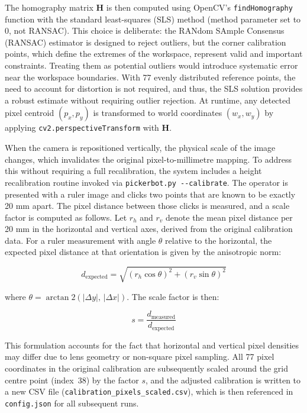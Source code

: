 \documentclass[conference]{IEEEtran}
\begin{document}
The homography matrix $\mathbf{H}$ is then computed using OpenCV's \texttt{findHomography} function with the standard least-squares (SLS) method (method parameter set to 0, not RANSAC). This choice is deliberate: the RANdom SAmple Consensus (RANSAC) estimator is designed to reject outliers, but the corner calibration points, which define the extremes of the workspace, represent valid and important constraints. Treating them as potential outliers would introduce systematic error near the workspace boundaries. With 77 evenly distributed reference points, the need to account for distortion is not required, and thus, the SLS solution provides a robust estimate without requiring outlier rejection. At runtime, any detected pixel centroid $(p_x, p_y)$ is transformed to world coordinates $(w_x, w_y)$ by applying \texttt{cv2.perspectiveTransform} with $\mathbf{H}$.

When the camera is repositioned vertically, the physical scale of the image changes, which invalidates the original pixel-to-millimetre mapping. To address this without requiring a full recalibration, the system includes a height recalibration routine invoked via \texttt{pickerbot.py {-}{-}calibrate}. The operator is presented with a ruler image and clicks two points that are known to be exactly 20 mm apart. The pixel distance between those clicks is measured, and a scale factor is computed as follows. Let $r_h$ and $r_v$ denote the mean pixel distance per 20 mm in the horizontal and vertical axes, derived from the original calibration data. For a ruler measurement with angle $\theta$ relative to the horizontal, the expected pixel distance at that orientation is given by the anisotropic norm:

\begin{equation}
  d_{\mathrm{expected}} = \sqrt{\left(r_h \cos\theta\right)^2 + \left(r_v \sin\theta\right)^2}
  \label{eq:expected_dist}
\end{equation}

where $\theta = \arctan2(|\Delta y|,\, |\Delta x|)$. The scale factor is then:

\begin{equation}
  s = \frac{d_{\mathrm{measured}}}{d_{\mathrm{expected}}}
  \label{eq:scale_factor}
\end{equation}

This formulation accounts for the fact that horizontal and vertical pixel densities may differ due to lens geometry or non-square pixel sampling. All 77 pixel coordinates in the original calibration are subsequently scaled around the grid centre point (index~38) by the factor $s$, and the adjusted calibration is written to a new CSV file (\texttt{calibration\_pixels\_scaled.csv}), which is then referenced in \texttt{config.json} for all subsequent runs.
\end{document}
